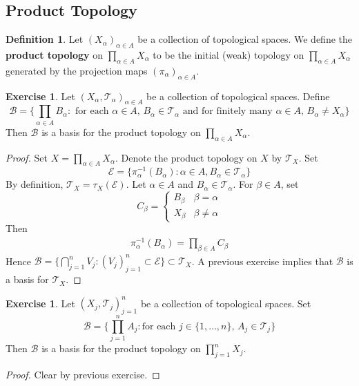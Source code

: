 \documentclass[12pt]{amsart}
\theoremstyle{definition}
\newtheorem{defn}[definition]{Definition}
\newtheorem{ex}[definition]{Exercise}
\newcommand{\al}{\alpha}
\newcommand{\be}{\beta}
\newcommand{\MB}{\mathcal{B}}
\newcommand{\ME}{\mathcal{E}}
\newcommand{\MT}{\mathcal{T}}
\newcommand{\tbf}[1]{\textbf{#1}}
\DeclareMathOperator*{\0}{\mbf{0}}
\DeclareMathOperator*{\1}{\mbf{1}}
\begin{document}
	
	
	
	\newpage
	\subsection{Product Topology}
	
	\begin{defn}
	Let $(X_{\al})_{\al \in A}$ be a collection of topological spaces. We define the \tbf{product topology} on $\prod_{\al \in A}X_{\al}$ to be the initial (weak) topology on $\prod\limits_{\al \in A} X_{\al}$ generated by the projection maps $(\pi_{\al})_{\al \in A}$.
	\end{defn}

	\begin{ex}
		Let $(X_{\al}, \MT_{\al})_{\al \in A}$ be a collection of topological spaces. Define $$\MB = \bigg \{\prod_{\al \in A}B_{\al}: \text{ for each $\al \in A$, } B_{\al} \in \MT_{\al} \text{ and for finitely many $\al \in A$, } B_{\al} \neq X_{\al} \bigg\}$$
		Then $\MB$ is a basis for the product topology on $\prod_{\al \in A}X_{\al}$.
	\end{ex}

	\begin{proof}
		Set $X = \prod_{\al \in A}X_{\al}$. Denote the product topology on $X$ by $\MT_X$. Set 
		$$\ME = \{\pi_{\al}^{-1}(B_{\al}): \al \in A, B_{\al} \in \MT_{\al}\}$$ 
		By definition, $\MT_{X} = \tau_{X}(\ME)$. Let $\al \in A$ and $B_{\al} \in \MT_{\al}$. For $\be \in A$, set 
		\[
		C_{\be} = 
		\begin{cases}
			B_{\be} & \be = \al \\
			X_{\be} & \be \neq \al
		\end{cases}
		\]
		Then 
		\begin{align*}
			\pi_{\al}^{-1}(B_{\al}) = \prod_{\be \in A} C_{\be}  
		\end{align*}
		Hence $\MB = \bigg \{\bigcap_{j=1}^n V_j:(V_j)_{j=1}^n \subset \ME \bigg \} \subset \MT_X$. A previous exercise implies that $\MB$ is a basis for $\MT_X$.
	\end{proof}

	\begin{ex}
		Let $(X_j, \MT_j)_{j =1}^n$ be a collection of topological spaces. Set 
		$$\MB = \bigg \{\prod\limits_{j=1}^n A_j: \text{for each $j \in \{1, \ldots, n\}$, } A_j \in \MT_{j} \bigg \}$$ 
		Then $\MB$ is a basis for the product topology on $\prod_{j=1}^n X_j$.
	\end{ex}

	\begin{proof}
		Clear by previous exercise.
	\end{proof}
\end{document}
